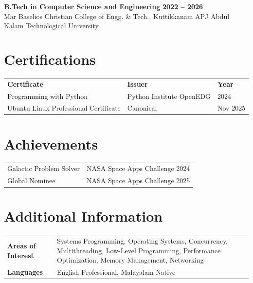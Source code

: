 \documentclass[10pt, a4paper]{article}
\begin{document}
\textbf{B.Tech in Computer Science and Engineering} \hfill \textbf{2022 -- 2026}\\
Mar Baselios Christian College of Engg. \& Tech., Kuttikkanam \hfill APJ Abdul Kalam Technological University

\section*{Certifications}

\renewcommand{\arraystretch}{1.1}
\begin{tabular}{@{} p{7.8cm} p{6.5cm} p{2.5cm} @{}}
\textbf{Certificate}                  & \textbf{Issuer}              & \textbf{Year} \\[1pt]
Programming with Python               & Python Institute OpenEDG   & 2024 \\
Ubuntu Linux Professional Certificate & Canonical                    & Nov 2025 \\
\end{tabular}

\section*{Achievements}

\begin{tabular}{@{} p{9.5cm} p{8cm} @{}}
Galactic Problem Solver              & NASA Space Apps Challenge 2024 \\
Global Nominee                       & NASA Space Apps Challenge 2025 \\
\end{tabular}

\section*{Additional Information}
 
\begin{tabular}{@{} >{\bfseries}p{3.8cm} p{13cm} @{}}
Areas of Interest & Systems Programming, Operating Systems, Concurrency, Multithreading, Low-Level Programming, Performance Optimization, Memory Management, Networking \\
Languages         & English Professional, Malayalam Native \\
\end{tabular}
 
\end{document}
